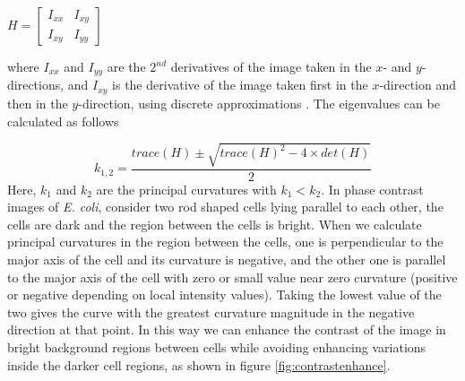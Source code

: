 \documentclass[journal]{IEEEtran}
\begin{document}
\begin{center}
	$H = \begin{bmatrix}
	I_{xx} & I_{xy} \\
	I_{xy} & I_{yy}
	\end{bmatrix}$
	
\end{center}


where $I_{xx}$ and $I_{yy}$ are the $2^{nd}$ derivatives of the image taken in the $x$- and $y$-directions, and $I_{xy}$ is the derivative of the image taken first in the $x$-direction and then in the $y$-direction, using discrete approximations \cite{woodfordnumerical2012}. The eigenvalues can be calculated as follows 


\begin{equation}
k_{1,2} = \frac{trace(H)\pm \sqrt{trace(H)^2 -4\times det(H)} }{2}
\end{equation}
Here, $k_1$ and $k_2$ are the principal curvatures with $k_1 < k_2$.  In phase contrast images of \textit{E. coli}, consider two rod shaped cells lying parallel to each other, the cells are dark and the region between the cells is bright. When we calculate principal curvatures in the region between the cells, one is perpendicular to the major axis of the cell and its curvature is negative, and the other one is parallel to the major axis of the cell with zero or small value near zero curvature (positive or negative depending on local intensity values). Taking the lowest value of the two gives the curve with the greatest curvature magnitude in the negative direction at that point. In this way we can enhance the contrast of the image in bright background regions between cells while avoiding enhancing variations inside the darker cell regions, as shown in figure \ref{fig:contrastenhance}. 
\end{document}
